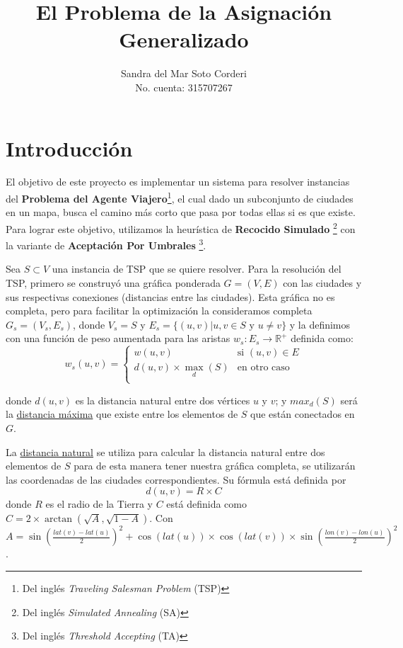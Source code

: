 \documentclass{article}
\title{El Problema de la Asignación Generalizado}
\author{
  Sandra del Mar Soto Corderi\\
  No. cuenta: 315707267
}
\date{}
\begin{document}
\maketitle

\section{Introducción}

El objetivo de este proyecto es implementar un sistema para resolver instancias del \textbf{Problema del Agente Viajero}\footnote{Del inglés \textit{Traveling Salesman Problem} (TSP)}, el cual dado un subconjunto de ciudades en un mapa, busca el camino más corto que pasa por todas ellas si es que existe.
Para lograr este objetivo, utilizamos la heurística de \textbf{Recocido Simulado} \footnote{Del inglés \textit{Simulated Annealing} (SA)} con la variante de \textbf{Aceptación Por Umbrales} \footnote{Del inglés \textit{Threshold Accepting} (TA)}.

Sea $S \subset V$ una instancia de TSP que se quiere resolver.
Para la resolución del TSP, primero se construyó una gráfica ponderada $G=(V,E)$ con las ciudades y sus respectivas conexiones (distancias entre las ciudades).
Esta gráfica no es completa, pero para facilitar la optimización la consideramos completa $G_s =(V_s, E_s)$, donde $V_s = S$ y $E_s= \{ (u,v) | u,v \in S \text{ y } u \not= v \}$ y la definimos con una función de peso aumentada para las aristas $w_s : E_s \to \mathds{R}^+$ definida como:
\[
  w_s(u,v) =
    \begin{cases}
      w(u,v)                   & \text{si }(u,v) \in E\\
      d(u,v) \times \max_d (S) &\text{en otro caso}\\
    \end{cases}
\]

donde $d(u,v)$ es la distancia natural entre dos vértices $u$ y $v$; y $max_d (S)$ será la \underline{distancia máxima} que existe entre los elementos de $S$ que están conectados en $G$.

La \underline{distancia natural} se utiliza para calcular la distancia natural entre dos elementos
de $S$ para de esta manera tener nuestra gráfica completa, se utilizarán las coordenadas de las
ciudades correspondientes. Su fórmula está definida por
\[
    d(u,v) = R \times C
\]
donde $R$ es el radio de la Tierra y $C$ está definida como $C = 2 \times \arctan(\sqrt{A},\sqrt{1-A})$. Con $A = \sin(\frac{lat(v)-lat(u)}{2})^2 + \cos(lat(u)) \times \cos(lat(v)) \times \sin(\frac{lon(v)-lon(u)}{2})^2$.
\end{document}
